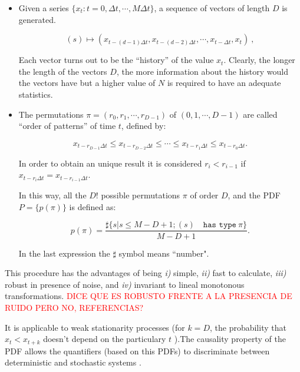 \begin{itemize}
\item Given a series $\{x_t : t=0, \Delta t, \cdots,M\Delta t \}$, a sequence of vectors of length $D$ is generated.

\begin{equation}
\label{eq:vectores}
(s)\mapsto \left(x_{t-(d-1)\Delta t},x_{t-(d-2)\Delta t},\cdots,x_{t-\Delta t},x_{t}\right) \ ,
\end{equation}

Each vector turns out to be the ``history'' of the value $x_t$. Clearly, the longer the length of the vectors $D$, the more information about the history would the vectors have but a higher value of $N$ is required to have an adequate statistics. 

\item The permutations $\pi=(r_0, r_1, \cdots, r_{D-1})$ of $(0, 1, \cdots, D-1)$ are called ``order of patterns'' of time $t$, defined by:

\begin{equation}
\label{eq:permuta}
x_{t-r_{D-1}\Delta t}\le x_{t-r_{D-2}\Delta t}\le\cdots\le x_{t-r_{1}\Delta t}\le x_{t-r_0\Delta t}.
\end{equation}

In order to obtain an unique result it is considered $r_i<r_{i-1}$ if $x_{t-r_{i}\Delta t}=x_{t-r_{i-1}\Delta t}$.

In this way, all the $D!$ possible permutations $\pi$ of order $D$, and the PDF $P=\{p(\pi)\}$ is defined as:

\begin{equation}
\label{eq:frequ}
p(\pi)=\frac{\sharp \{s|s\leq M-D+1; (s) \quad \texttt{has type}~\pi\}}{M-D+1}.
\end{equation}

In the last expression the $\sharp$ symbol means ``number".
\end{itemize}

This procedure has the advantages of being {\it i)} simple, {\it ii)} fast to calculate, {\it iii)} robust in presence of noise, and {\it iv)} invariant to lineal monotonous transformations. \textcolor{red}{DICE QUE ES ROBUSTO FRENTE A LA PRESENCIA DE RUIDO PERO NO, REFERENCIAS?}

It is applicable to weak stationarity processes (for $k=D$, the probability that $x_t < x_{t+k}$ doesn't depend on the particulary $t$ \cite{Pompe2002}).The causality property of the PDF allows the quantifiers (based on this PDFs) to discriminate between deterministic and stochastic systems \cite{Rosso2007B}.

